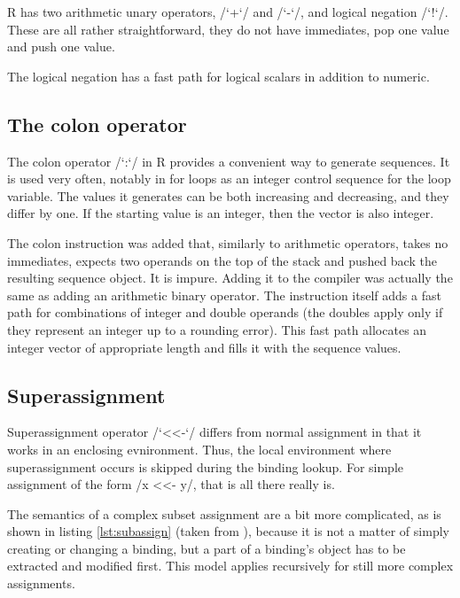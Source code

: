R has two arithmetic unary operators, \rinline/`+`/ and \rinline/`-`/, and logical negation \rinline/`!`/. These are all rather straightforward, they do not have immediates, pop one value and push one value.

The logical negation has a fast path for logical scalars in addition to numeric.


\subsection{The colon operator}

The colon operator \rinline/`:`/ in R provides a convenient way to generate sequences. It is used very often, notably in \todo[verb]for loops as an integer control sequence for the loop variable. The values it generates can be both increasing and decreasing, and they differ by one. If the starting value is an integer, then the vector is also integer.

The colon instruction was added that, similarly to arithmetic operators, takes no immediates, expects two operands on the top of the stack and pushed back the resulting sequence object. It is impure. Adding it to the compiler was actually the same as adding an arithmetic binary operator. The instruction itself adds a fast path for combinations of integer and double operands (the doubles apply only if they represent an integer up to a rounding error). This fast path allocates an integer vector of appropriate length and fills it with the sequence values.


\subsection{Superassignment}

Superassignment operator \rinline/`<<-`/ differs from normal assignment in that it works in an enclosing evnironment. Thus, the local environment where superassignment occurs is skipped during the binding lookup. For simple assignment of the form \rinline/x <<- y/, that is all there really is.

The semantics of a complex subset assignment are a bit more complicated, as is shown in listing \ref{lst:subassign} (taken from \autocite{subset}), because it is not a matter of simply creating or changing a binding, but a part of a binding's object has to be extracted and modified first. This model applies recursively for still more complex assignments.

